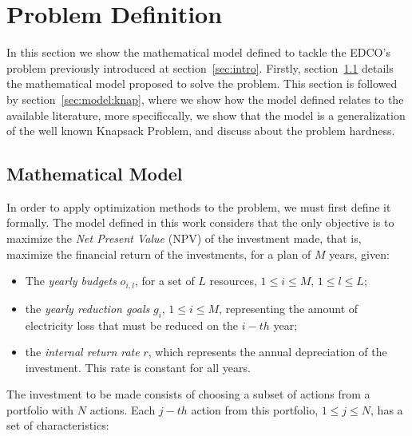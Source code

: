 \section{Problem Definition}
\label{sec:model}

In this section we show the mathematical model defined to tackle the EDCO's problem previously introduced at section~\ref{sec:intro}.
Firstly, section~\ref{sec:model:model} details the mathematical model proposed to solve the problem.
This section is followed by section~\ref{sec:model:knap}, where we show how the model defined relates 
to the available literature, more specificcally, we show that the model is a generalization of the 
well known Knapsack Problem, and discuss about the problem hardness.

\subsection{Mathematical Model}
\label{sec:model:model}

In order to apply optimization methods to the problem, we must first define it formally. 
The model defined in this work considers that the only objective is to maximize the 
\textit{Net Present Value} (NPV) of the investment made, that is, maximize the financial return
of the investments, for a plan of $M$ years, given:

\begin{itemize}
  \item The \textit{yearly budgets} $o_{i,l}$, for a set of $L$ resources, $1 \le i \le M$, $1 \le l \le L$;
  \item the \textit{yearly reduction goals} $g_i$, $1 \le i \le M$, representing the amount of electricity loss 
        that must be reduced on the $i-th$ year;
  \item the \textit{internal return rate} $r$, which represents the annual depreciation of the investment.
	This rate is constant for all years.
\end{itemize}

The investment to be made consists of choosing a subset of actions from a portfolio with $N$ actions.
Each $j-th$ action from this portfolio, $1 \le j \le N$, has a set of characteristics:

